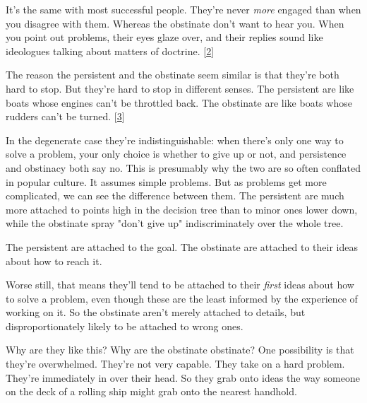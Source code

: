 It's the same with most successful people.
                  They're never \emph{more}
                  engaged than when you disagree with them. Whereas the
                  obstinate don't want to hear you. When you point out problems,
                  their eyes glaze over, and their replies sound like ideologues
                  talking about matters of doctrine.
                  [\href{\#f2n}{2}]

The reason the persistent and the obstinate seem
                  similar is that they're both hard to stop. But they're hard to
                  stop in different senses. The persistent are like boats whose
                  engines can't be throttled back. The obstinate are like boats
                  whose rudders can't be turned.
                  [\href{\#f3n}{3}]

In the degenerate case they're indistinguishable:
                  when there's only one way to solve a problem, your only choice
                  is whether to give up or not, and persistence and obstinacy
                  both say no. This is presumably why the two are so often
                  conflated in popular culture. It assumes simple problems. But
                  as problems get more complicated, we can see the difference
                  between them. The persistent are much more attached to points
                  high in the decision tree than to minor ones lower down, while
                  the obstinate spray "don't give up" indiscriminately over the
                  whole tree.

The persistent are attached to the
                  goal. The obstinate are attached to their ideas about how to
                  reach it.

Worse still, that means they'll tend to
                  be attached to their \emph{first} ideas about how to solve a
                  problem, even though these are the least informed by the
                  experience of working on it. So the obstinate aren't merely
                  attached to details, but disproportionately likely to be
                  attached to wrong ones.



Why are they
                  like this? Why are the obstinate obstinate? One possibility is
                  that they're overwhelmed. They're not very capable. They take
                  on a hard problem. They're immediately in over their head. So
                  they grab onto ideas the way someone on the deck of a rolling
                  ship might grab onto the nearest handhold.

